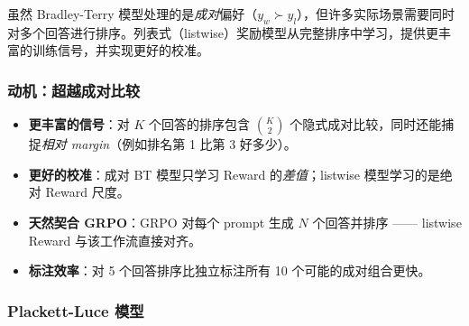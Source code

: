虽然 Bradley-Terry 模型处理的是\emph{成对}偏好（$y_w \succ y_l$），但许多实际场景需要同时对多个回答进行排序。列表式（listwise）奖励模型从完整排序中学习，提供更丰富的训练信号，并实现更好的校准。

\subsubsection*{动机：超越成对比较}
\label{motivation-beyond-pairwise}

\begin{intuitionbox}
\begin{itemize}
  \item \textbf{更丰富的信号}：对 $K$ 个回答的排序包含 $\binom{K}{2}$ 个隐式成对比较，同时还能捕捉\emph{相对 margin}（例如排名第 1 比第 3 好多少）。
  \item \textbf{更好的校准}：成对 BT 模型只学习 Reward 的\emph{差值}；listwise 模型学习的是绝对 Reward 尺度。
  \item \textbf{天然契合 GRPO}：GRPO 对每个 prompt 生成 $N$ 个回答并排序 —— listwise Reward 与该工作流直接对齐。
  \item \textbf{标注效率}：对 5 个回答排序比独立标注所有 10 个可能的成对组合更快。
\end{itemize}
\end{intuitionbox}

\subsubsection*{Plackett-Luce 模型}
\label{plackett-luce-model}

